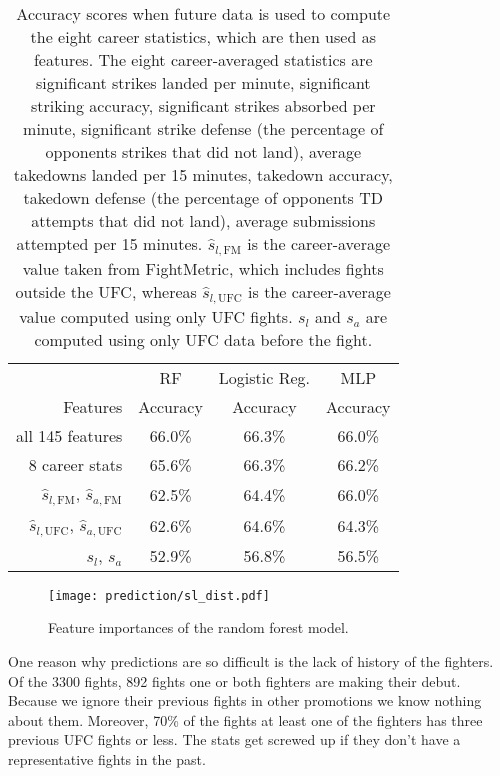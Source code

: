 \begin{center}
\begin{table}[h]
\begin{tabular}{r|ccc}
\toprule
         & RF       & Logistic Reg. & MLP     \\
Features & Accuracy & Accuracy      & Accuracy\\
\hline
all 145 features & 66.0\% & 66.3\% & 66.0\% \\
8 career stats & 65.6\% & 66.3\% & 66.2\% \\
$\hat{s}_{l,\textrm{FM}}$, $\hat{s}_{a,\textrm{FM}}$ & 62.5\% & 64.4\% & 66.0\% \\
$\hat{s}_{l,\textrm{UFC}}$, $\hat{s}_{a,\textrm{UFC}}$ & 62.6\% & 64.6\% & 64.3\% \\
$s_l$, $s_a$ & 52.9\% & 56.8\% & 56.5\% \\
\bottomrule
\end{tabular}
\caption{Accuracy scores when future data is used
to compute the eight career statistics, which are then
used as features.
The eight career-averaged statistics are
significant strikes landed per minute,
significant striking accuracy,
significant strikes absorbed per minute,
significant strike defense  (the percentage of opponents strikes that did not land),
average takedowns landed per 15 minutes,
takedown accuracy,
takedown defense (the percentage of opponents TD attempts that did not land),
average submissions attempted per 15 minutes. $\hat{s}_{l,\textrm{FM}}$ is
the career-average value taken from FightMetric, which
includes fights outside the UFC, whereas $\hat{s}_{l,\textrm{UFC}}$ is
the career-average value computed using only UFC fights.
$s_l$ and $s_a$ are computed using only UFC data before the fight.}
\label{scores_using_career_stats}
\end{table}
\end{center}



\begin{figure}[h]
\begin{center}
\texttt{[image: prediction/sl\_dist.pdf]}
\caption{Feature importances of the random forest model.}
\label{normalized_sl_dist}
\end{center}
\end{figure}

One reason why predictions are so difficult is the lack of history
of the fighters. Of the 3300 fights, 892 fights one or both
fighters are making their debut. Because we ignore their previous
fights in other promotions we know nothing about them. Moreover,
70\% of the fights at least one of the fighters has three previous
UFC fights or less. The stats get screwed up if they don't have
a representative fights in the past.

